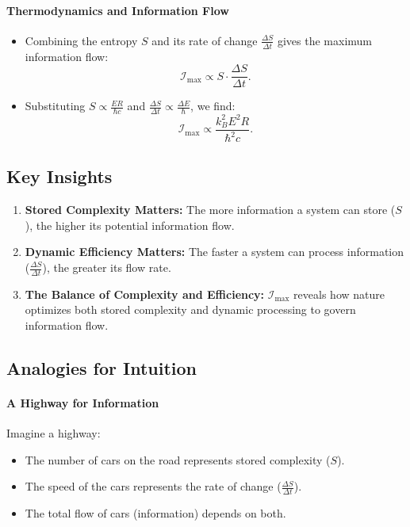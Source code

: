 \documentclass[12pt]{article}
\begin{document}
\paragraph{Thermodynamics and Information Flow}
\begin{itemize}
    \item Combining the entropy \(S\) and its rate of change \(\frac{\Delta S}{\Delta t}\) gives the maximum information flow:
    \[
    \mathcal{I}_{\text{max}} \propto S \cdot \frac{\Delta S}{\Delta t}.
    \]
    \item Substituting \(S \propto \frac{E R}{\hbar c}\) and \(\frac{\Delta S}{\Delta t} \propto \frac{\Delta E}{\hbar}\), we find:
    \[
    \mathcal{I}_{\text{max}} \propto \frac{k_B^2 E^2 R}{\hbar^2 c}.
    \]
\end{itemize}

\subsection{Key Insights}
\begin{enumerate}
    \item \textbf{Stored Complexity Matters:} The more information a system can store (\(S\)), the higher its potential information flow.
    \item \textbf{Dynamic Efficiency Matters:} The faster a system can process information (\(\frac{\Delta S}{\Delta t}\)), the greater its flow rate.
    \item \textbf{The Balance of Complexity and Efficiency:} \(\mathcal{I}_{\text{max}}\) reveals how nature optimizes both stored complexity and dynamic processing to govern information flow.
\end{enumerate}

\subsection{Analogies for Intuition}
\paragraph{A Highway for Information}
Imagine a highway:
\begin{itemize}
    \item The number of cars on the road represents stored complexity (\(S\)).
    \item The speed of the cars represents the rate of change (\(\frac{\Delta S}{\Delta t}\)).
    \item The total flow of cars (information) depends on both.
\end{itemize}
\end{document}

